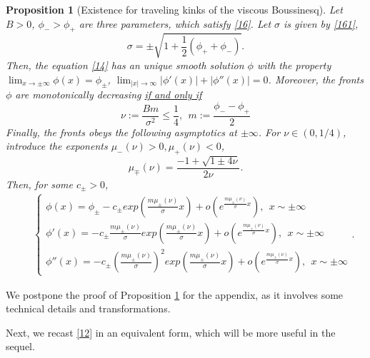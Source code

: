 \documentclass[12pt]{amsart}
\newtheorem{proposition}{Proposition}
\theoremstyle{definition}
\theoremstyle{remark}
\numberwithin{equation}{section}
\renewcommand{\(}{\left(}
\renewcommand{\)}{\right)}
\renewcommand{\[}{\left[}
\renewcommand{\]}{\right]}
\newcommand{\f}[2]{\frac{#1}{#2}}
\newcommand{\si}{\sigma}
\begin{document}
 \begin{proposition}[Existence for traveling kinks of the viscous Boussinesq]
 \label{prop:10} 
 Let $B>0$, $\phi_->\phi_+$ are three parameters, which satisfy \eqref{16}. Let $\si$ is given by \eqref{161}, 
 $$
 \si=\pm \sqrt{1+\f{1}{2} (\phi_+ + \phi_-)}.
 $$
  Then, the equation \eqref{14} has an  unique smooth solution $\phi$ with the property $\lim_{x\to \pm \infty} \phi(x) = \phi_\pm$, $\lim_{|x|\to \infty} |\phi'(x)|+|\phi''(x)| =0$. 
 Moreover, the fronts $\phi$ are monotonically decreasing \underline{if and only if} 
 \begin{equation}
 	\label{292} 
 	\nu:=\f{Bm}{\si^2}\leq \f{1}{4}, \ \ m:=\f{\phi_- - \phi_+}{2}
 \end{equation}
 Finally, the fronts obeys the following asymptotics at $\pm \infty$. For $\nu\in (0, 1/4)$, introduce the exponents $\mu_-(\nu)>0, \mu_+(\nu)<0$, 
	$$
	\mu_{\mp}(\nu)=\f{-1+\sqrt{1\pm 4\nu}}{2\nu}.
	$$
	Then, for some $c_\pm>0$, 
\begin{eqnarray}
	\label{f:1} 
	& & \begin{cases}
		\phi(x)=\phi_\pm - c_\pm exp(\f{m \mu_{\pm}(\nu)}{\si} x)+o(e^{\f{m \mu_{\pm}(\nu)}{\si} x}), \ \ x\sim \pm \infty \\
		\phi'(x)=- c_\pm \f{m \mu_{\pm}(\nu)}{\si} exp(\f{m \mu_{\pm}(\nu)}{\si} x)+o(e^{\f{m \mu_{\pm}(\nu)}{\si} x}), \ \ x\sim \pm \infty \\
		\phi''(x)=- c_\pm \left(\f{m \mu_{\pm}(\nu)}{\si}\right)^2 exp(\f{m \mu_{\pm}(\nu)}{\si} x)+o(e^{\f{m \mu_{\pm}(\nu)}{\si} x}), \ \ x\sim \pm \infty 
		\end{cases}. 
\end{eqnarray}

	
	
	
	
\end{proposition}
 We postpone the proof of Proposition \ref{prop:10} for the appendix, as it involves some technical details and transformations. 
 
 Next, we recast \eqref{12} in an equivalent form, which will be more useful in the sequel. 
\end{document}
